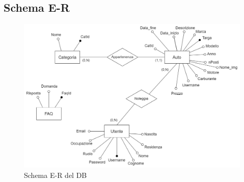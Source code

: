 \documentclass[12pt,a4paperS]{report}
\begin{document}
\begin{normalsize}
				\subsection{Schema E-R}
					\begin{figure}[H]
						\centering
						\includegraphics[width=1.15\textwidth, height=1.15\textheight, trim=100 0 0 0,keepaspectratio]{Grafici/Database.png}
						\newline
						\caption{Schema E-R del DB}
					\end{figure}
		\end{normalsize}
		
\end{document}

